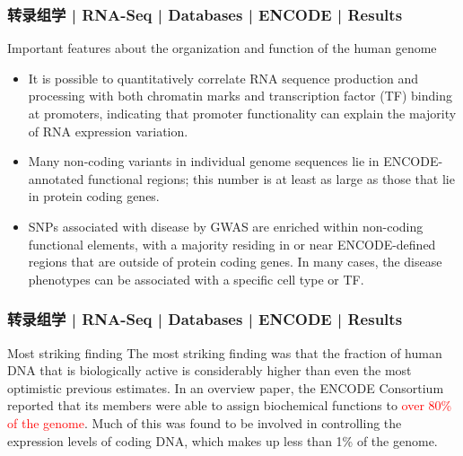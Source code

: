 \begin{frame}
  \frametitle{转录组学 | RNA-Seq | Databases | ENCODE | Results}
  \begin{block}{Important features about the organization and function of the human genome}
  \begin{itemize}
    \item It is possible to quantitatively correlate RNA sequence production and processing with both chromatin marks and transcription factor (TF) binding at promoters, indicating that promoter functionality can explain the majority of RNA expression variation.
    \item Many non-coding variants in individual genome sequences lie in ENCODE-annotated functional regions; this number is at least as large as those that lie in protein coding genes.
    \item SNPs associated with disease by GWAS are enriched within non-coding functional elements, with a majority residing in or near ENCODE-defined regions that are outside of protein coding genes. In many cases, the disease phenotypes can be associated with a specific cell type or TF.
  \end{itemize}
  \end{block}
\end{frame}

\begin{frame}
  \frametitle{转录组学 | RNA-Seq | Databases | ENCODE | Results}
  \begin{block}{Most striking finding}
    The most striking finding was that the fraction of human DNA that is biologically active is considerably higher than even the most optimistic previous estimates. In an overview paper, the ENCODE Consortium reported that its members were able to assign biochemical functions to \textcolor{red}{over 80\% of the genome}. Much of this was found to be involved in controlling the expression levels of coding DNA, which makes up less than 1\% of the genome.
  \end{block}
\end{frame}

